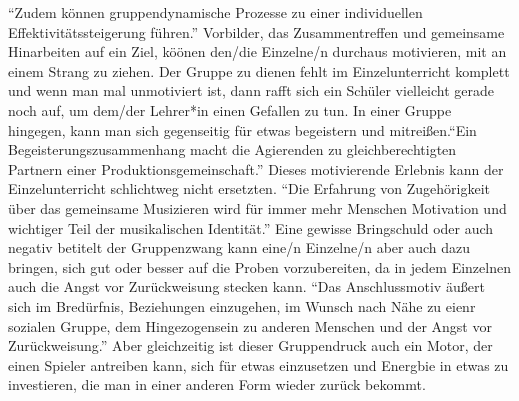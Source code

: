 \autocite[94]{mitzscherlich:musikpsychologie} \enquote{Zudem können
gruppendynamische Prozesse zu einer individuellen Effektivitätssteigerung
führen.} \autocite{losert:die_kunst_zu_unterrichten} Vorbilder, das
Zusammentreffen und gemeinsame Hinarbeiten auf ein Ziel, köönen den/die Einzelne/n
durchaus motivieren, mit an einem Strang zu ziehen. Der Gruppe zu dienen
fehlt im Einzelunterricht komplett und wenn man mal unmotiviert ist, dann rafft
sich ein Schüler vielleicht gerade noch auf, um dem/der Lehrer*in einen Gefallen zu
tun. In einer Gruppe hingegen, kann man sich gegenseitig für etwas begeistern
und mitreißen.\enquote{Ein Begeisterungszusammenhang macht die Agierenden zu
gleichberechtigten Partnern einer Produktionsgemeinschaft.}
\autocite[198]{busch:grundwissen_instrumentalpaedagogik} Dieses motivierende
Erlebnis kann der Einzelunterricht schlichtweg nicht ersetzten. \enquote{Die
Erfahrung von Zugehörigkeit über das gemeinsame Musizieren wird für immer mehr
Menschen Motivation und wichtiger Teil der musikalischen Identität.}
\autocite[123]{mitzscherlich:musikpsychologie} Eine gewisse Bringschuld oder
auch negativ betitelt der Gruppenzwang kann eine/n Einzelne/n aber auch dazu
bringen, sich gut oder besser auf die Proben vorzubereiten, da in jedem
Einzelnen auch die Angst vor Zurückweisung stecken kann. \enquote{Das
Anschlussmotiv äußert sich im Bredürfnis, Beziehungen einzugehen, im Wunsch nach
Nähe zu eienr sozialen Gruppe, dem Hingezogensein zu anderen Menschen und der
Angst vor Zurückweisung.} \autocite[120ff]{losert:die_kunst_zu_unterrichten}
Aber gleichzeitig ist dieser Gruppendruck auch ein Motor, der einen Spieler
antreiben kann, sich für etwas einzusetzen und Energbie in etwas zu investieren,
die man in einer anderen Form wieder zurück bekommt.








